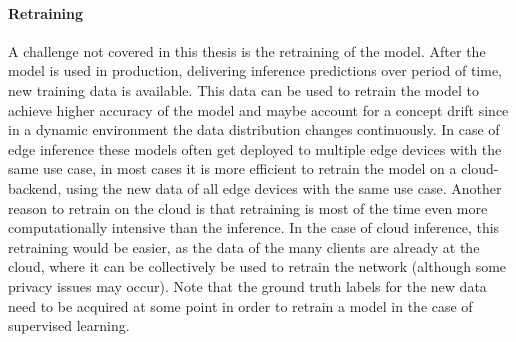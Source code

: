 \paragraph{Retraining}
A challenge not covered in this thesis is the retraining of the model. After the model is used in production, delivering inference predictions over period of time, new training data is available. This data can be used to retrain the model to achieve higher accuracy of the model and maybe account for a concept drift since in a dynamic environment the data distribution changes continuously.
In case of edge inference these models often get deployed to multiple edge devices with the same use case, in most cases it is more efficient to retrain the model on a cloud-backend, using the new data of all edge devices with the same use case. Another reason to retrain on the cloud is that retraining is most of the time even more computationally intensive than the inference.
In the case of cloud inference, this retraining would be easier, as the data of the many clients are already at the cloud, where it can be collectively be used to retrain the network (although some privacy issues may occur).
Note that the ground truth labels for the new data need to be acquired at some point in order to retrain a model in the case of supervised learning.
\endinput 

